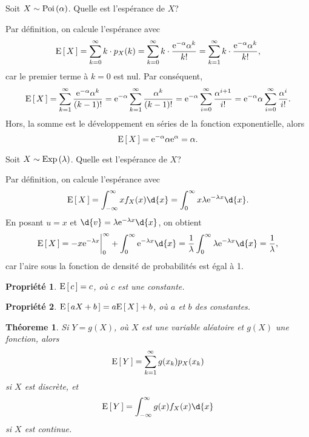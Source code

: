 \documentclass[11pt]{article}
\newcommand\e{%
	\ensuremath{%
		\mathrm{e}%
	}%
}%
\newcommand\Poi[1]{%
	\ensuremath{%
		\mathrm{Poi}\left(#1\right)%
	}%
}%
\newcommand\Exp[1]{%
	\ensuremath{%
		\mathrm{Exp}\left(#1\right)%
	}%
}%
\newcommand\Esp[1]{%
	\ensuremath{%
		\mathrm{E}\left[\,#1\,\right]%
	}%
}%
\newtheorem{theoreme}{Théoreme}[section]
\newtheorem{property}{Propriété}
\theoremstyle{remark}
\theoremstyle{definition}
\begin{document}
\begin{exemple}
	Soit $X\sim\Poi{\alpha}$. Quelle est l'espérance de $X$?

	Par définition, on calcule l'espérance avec
	\begin{equation*}
		\Esp{X}
		=\sum_{k=0}^\infty k\cdot p_X(k)
		=\sum_{k=0}^\infty k\cdot\frac{\e^{-\alpha}\alpha^k}{k!}
		=\sum_{k=1}^\infty k\cdot\frac{\e^{-\alpha}\alpha^k}{k!},
	\end{equation*}
	car le premier terme à $k=0$ est nul. Par conséquent,
	\begin{equation*}
		\Esp{X}
		=\sum_{k=1}^\infty\frac{\e^{-\alpha}\alpha^k}{(k-1)!}
		=\e^{-\alpha}\sum_{k=1}^\infty\frac{\alpha^k}{(k-1)!}
		=\e^{-\alpha}\sum_{i=0}^\infty\frac{\alpha^{i+1}}{i!}
		=\e^{-\alpha}\alpha\sum_{i=0}^\infty\frac{\alpha^i}{i!}.
	\end{equation*}
	Hors, la somme est le développement en séries de la fonction exponentielle,
	alors
	\begin{equation*}
		\Esp{X}
		=\e^{-\alpha}\alpha\e^{\alpha}
		=\alpha.
	\end{equation*}
\end{exemple}

\begin{exemple}
	Soit $X\sim\Exp{\lambda}$. Quelle est l'espérance de $X$?

	Par définition, on calcule l'espérance avec
	\begin{equation*}
		\Esp{X}
		=\int_{-\infty}^\infty xf_X(x)\d{x}
		=\int_0^\infty x\lambda\e^{-\lambda x}\d{x}.
	\end{equation*}
	En posant $u=x$ et $\d{v}=\lambda\e^{-\lambda x}\d{x}$, on obtient
	\begin{equation*}
		\Esp{X}
		=-x\e^{-\lambda x}\bigg\rvert_0^\infty
		+\int_0^\infty\e^{-\lambda x}\d{x}
		=\frac{1}{\lambda}\int_0^\infty\lambda\e^{-\lambda x}\d{x}
		=\frac{1}{\lambda},
	\end{equation*}
	car l'aire sous la fonction de densité de probabilités est égal à 1.
\end{exemple}

\begin{property}
	$\Esp{c}=c$, où $c$ est une constante.
\end{property}

\begin{property}
	$\Esp{aX+b}=a\Esp{X}+b$, où $a$ et $b$ des constantes.
\end{property}

\begin{theoreme}
	Si $Y=g(X)$, où $X$ est une variable aléatoire et $g(X)$ une fonction,
	alors
	\begin{equation*}
		\Esp{Y}=\sum_{k=1}^\infty g(x_k)p_X(x_k)
	\end{equation*}
	si $X$ est discrète, et
	\begin{equation*}
		\Esp{Y}=\int_{-\infty}^\infty g(x)f_X(x)\d{x}
	\end{equation*}
	si $X$ est continue.
\end{theoreme}
\end{document}
